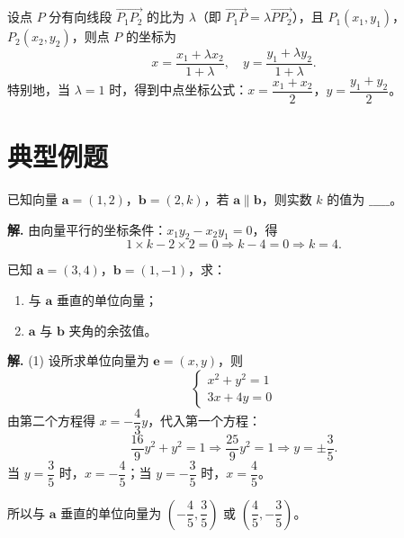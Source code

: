 \documentclass[11pt]{ctexrep}
\begin{document}
\begin{property}[定比分点坐标公式]
    设点 $P$ 分有向线段 $\overrightarrow{P_1P_2}$ 的比为 $\lambda$（即 $\overrightarrow{P_1P} = \lambda\overrightarrow{PP_2}$），且 $P_1(x_1, y_1)$，$P_2(x_2, y_2)$，则点 $P$ 的坐标为
    \[
        x = \dfrac{x_1 + \lambda x_2}{1+\lambda}, \quad y = \dfrac{y_1 + \lambda y_2}{1+\lambda}.
    \]
    特别地，当 $\lambda = 1$ 时，得到中点坐标公式：$x = \dfrac{x_1+x_2}{2}$，$y = \dfrac{y_1+y_2}{2}$。
\end{property}

\section*{典型例题}

\begin{example}[向量平行的坐标表示]
    已知向量 $\boldsymbol{a} = (1, 2)$，$\boldsymbol{b} = (2, k)$，若 $\boldsymbol{a} \parallel \boldsymbol{b}$，则实数 $k$ 的值为 $\_\_\_\_\_$。
\end{example}

\textbf{解.} 由向量平行的坐标条件：$x_1y_2 - x_2y_1 = 0$，得
\[
    1 \times k - 2 \times 2 = 0 \Rightarrow k - 4 = 0 \Rightarrow k = 4.
\]

\begin{example}[向量垂直与夹角]
    已知 $\boldsymbol{a} = (3, 4)$，$\boldsymbol{b} = (1, -1)$，求：
    \begin{enumerate}
        \item 与 $\boldsymbol{a}$ 垂直的单位向量；
        \item $\boldsymbol{a}$ 与 $\boldsymbol{b}$ 夹角的余弦值。
    \end{enumerate}
\end{example}

\textbf{解.} (1) 设所求单位向量为 $\boldsymbol{e} = (x, y)$，则
\[
    \begin{cases}
        x^2 + y^2 = 1 \\
        3x + 4y = 0
    \end{cases}
\]
由第二个方程得 $x = -\dfrac{4}{3}y$，代入第一个方程：
\[
    \dfrac{16}{9}y^2 + y^2 = 1 \Rightarrow \dfrac{25}{9}y^2 = 1 \Rightarrow y = \pm\dfrac{3}{5}.
\]
当 $y = \dfrac{3}{5}$ 时，$x = -\dfrac{4}{5}$；当 $y = -\dfrac{3}{5}$ 时，$x = \dfrac{4}{5}$。

所以与 $\boldsymbol{a}$ 垂直的单位向量为 $\left(-\dfrac{4}{5}, \dfrac{3}{5}\right)$ 或 $\left(\dfrac{4}{5}, -\dfrac{3}{5}\right)$。
\end{document}
